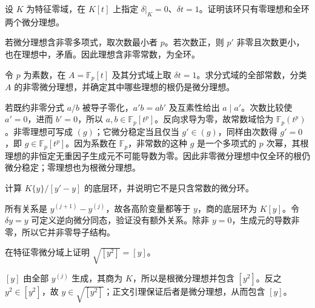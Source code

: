 \begin{exercise}\label{b3:ex:E-polynomial-differential-ideals}
	设 \(K\) 为特征零域，在 \(K[t]\) 上指定 \(\delta|_K=0\)、\(\delta t=1\)。证明该环只有零理想和全环两个微分理想。
\end{exercise}
\begin{solution}
	若微分理想含非零多项式，取次数最小者 \(p\)。若次数正，则 \(p'\) 非零且次数更小，也在理想中，矛盾。因此理想含非零常数，为全环。
\end{solution}

\begin{exercise}\label{b3:ex:E-characteristic-p-warning}
	令 \(p\) 为素数，在 \(A=\mathbb F_p[t]\) 及其分式域上取 \(\delta t=1\)。求分式域的全部常数，分类 \(A\) 的非零微分理想，并确定其中哪些理想的根仍是微分理想。
\end{exercise}
\begin{solution}
	若既约非零分式 \(a/b\) 被导子零化，\(a'b=ab'\) 及互素性给出 \(a\mid a'\)。次数比较使 \(a'=0\)，进而 \(b'=0\)，所以 \(a,b\in\mathbb F_p[t^p]\)。反向求导为零，故常数域恰为 \(\mathbb F_p(t^p)\)。非零理想可写成 \((g)\)；它微分稳定当且仅当 \(g'\in(g)\)，同样由次数得 \(g'=0\)，即 \(g\in\mathbb F_p[t^p]\)。因为系数在 \(\mathbb F_p\)，非常数的这种 \(g\) 是一个多项式的 \(p\) 次幂，其根理想的非恒定无重因子生成元不可能导数为零。因此非零微分理想中仅全环的根仍微分稳定；零理想也为根微分理想。
\end{solution}

\begin{exercise}\label{b3:ex:E-differential-polynomial-map}
	计算 \(K\{y\}/[y'-y]\) 的底层环，并说明它不是只含常数的微分环。
\end{exercise}
\begin{solution}
	所有关系是 \(y^{(j+1)}-y^{(j)}\)，故各高阶变量都等于 \(y\)，商的底层环为 \(K[y]\)。令 \(\delta y=y\) 可定义逆向微分同态，验证没有额外关系。除非 \(y=0\)，生成元的导数非零，所以它并非零导子结构。
\end{solution}

\begin{exercise}\label{b3:ex:E-root-differential-ideal}
	在特征零微分域上证明 \(\sqrt{[y^2]}=[y]\)。
\end{exercise}
\begin{solution}
	\([y]\) 由全部 \(y^{(j)}\) 生成，其商为 \(K\)，所以是根微分理想并包含 \([y^2]\)。反之 \(y^2\in[y^2]\)，故 \(y\in\sqrt{[y^2]}\)；正文引理保证后者是微分理想，从而包含 \([y]\)。
\end{solution}

